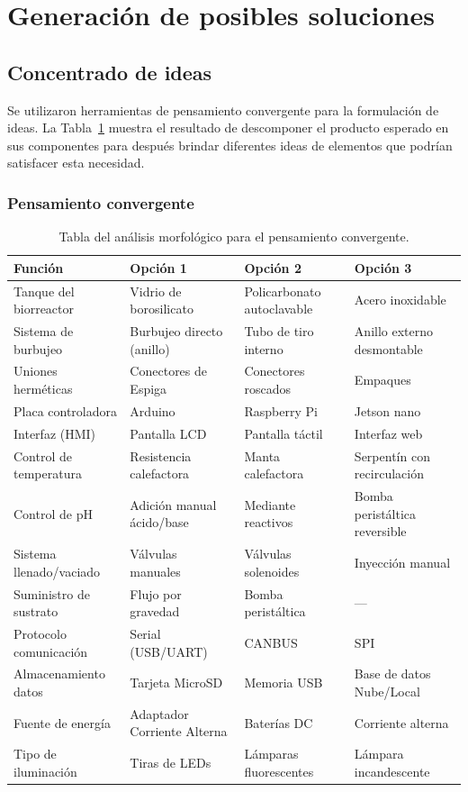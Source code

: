 \section{Generación de posibles soluciones}

\subsection{Concentrado de ideas}

Se utilizaron herramientas de pensamiento convergente para la formulación de
ideas. La Tabla~\ref{tab:morfologico} muestra el resultado de descomponer el producto esperado en
sus componentes para después brindar diferentes ideas de elementos que podrían
satisfacer esta necesidad.

\subsubsection{Pensamiento convergente}

\begin{table}[H]
\centering
\caption{Tabla del análisis morfológico para el pensamiento convergente.}
\label{tab:morfologico}
\renewcommand{\arraystretch}{1.3}
\small
\begin{tabularx}{\textwidth}{@{} p{} X X X @{}}
\toprule
\textbf{Función} & \textbf{Opción 1} & \textbf{Opción 2} & \textbf{Opción 3} \\
\midrule
Tanque del biorreactor & Vidrio de borosilicato & Policarbonato autoclavable & Acero inoxidable \\
Sistema de burbujeo & Burbujeo directo (anillo) & Tubo de tiro interno & Anillo externo desmontable \\
Uniones herméticas & Conectores de Espiga & Conectores roscados & Empaques \\
Placa controladora & Arduino & Raspberry Pi & Jetson nano \\
Interfaz (HMI) & Pantalla LCD & Pantalla táctil & Interfaz web \\
Control de temperatura & Resistencia calefactora & Manta calefactora & Serpentín con recirculación \\
Control de pH & Adición manual ácido/base & Mediante reactivos & Bomba peristáltica reversible \\
Sistema llenado/vaciado & Válvulas manuales & Válvulas solenoides & Inyección manual \\
Suministro de sustrato & Flujo por gravedad & Bomba peristáltica & --- \\
Protocolo comunicación & Serial (USB/UART) & CANBUS & SPI \\
Almacenamiento datos & Tarjeta MicroSD & Memoria USB & Base de datos Nube/Local \\
Fuente de energía & Adaptador Corriente Alterna & Baterías DC & Corriente alterna \\
Tipo de iluminación & Tiras de LEDs & Lámparas fluorescentes & Lámpara incandescente \\
\bottomrule
\end{tabularx}
\end{table}

